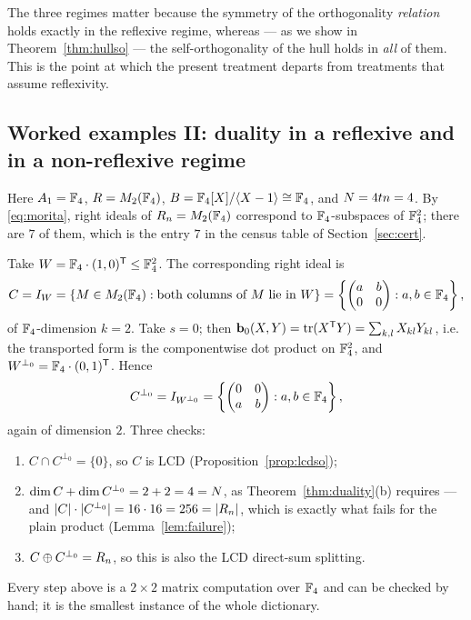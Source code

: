 \begin{remark}
The three regimes matter because the symmetry of the orthogonality
\emph{relation} holds exactly in the reflexive regime, whereas --- as we show in
Theorem~\ref{thm:hullso} --- the self-orthogonality of the hull holds in
\emph{all} of them. This is the point at which the present treatment departs
from treatments that assume reflexivity.
\end{remark}

\subsection{Worked examples II: duality in a reflexive and in a
non-reflexive regime}

\begin{example}[a Galois dual computed both ways, at $(q,t,n)=(4,1,1)$]
\label{ex:dual}
Here $A_1=\mathbb F_4$, $R=M_2(\mathbb F_4)$, $B=\mathbb F_4[X]/\langle X-1\rangle\cong\mathbb F_4$, and
$N=4tn=4$. By \eqref{eq:morita}, right ideals of $R_n=M_2(\mathbb F_4)$
correspond to $\mathbb F_4$-subspaces of $\mathbb F_4^2$; there are $7$ of them, which is
the entry $7$ in the census table of Section~\ref{sec:cert}.

Take $W=\mathbb F_4\cdot(1,0)^{\mathsf T}\le\mathbb F_4^2$. The corresponding right ideal is
\[
  C=I_W=\{M\in M_2(\mathbb F_4):\text{both columns of }M\text{ lie in }W\}
  =\left\{\begin{pmatrix}a&b\\0&0\end{pmatrix}:a,b\in\mathbb F_4\right\},
\]
of $\mathbb F_4$-dimension $k=2$. Take $s=0$; then $\mathbf b_0(X,Y)=\operatorname{tr}(X^{\mathsf T}Y)
=\sum_{k,l}X_{kl}Y_{kl}$, i.e. the transported form is the componentwise dot
product on $\mathbb F_4^2$, and $W^{\perp_0}=\mathbb F_4\cdot(0,1)^{\mathsf T}$. Hence
\[
  C^{\perp_0}=I_{W^{\perp_0}}
  =\left\{\begin{pmatrix}0&0\\a&b\end{pmatrix}:a,b\in\mathbb F_4\right\},
\]
again of dimension $2$. Three checks:
\begin{enumerate}[label=\textnormal{(\roman*)},leftmargin=*]
\item $C\cap C^{\perp_0}=\{0\}$, so $C$ is LCD (Proposition~\ref{prop:lcdso});
\item $\dim C+\dim C^{\perp_0}=2+2=4=N$, as
  Theorem~\ref{thm:duality}(b) requires --- and $|C|\cdot|C^{\perp_0}|
  =16\cdot16=256=|R_n|$, which is exactly what fails for the plain product
  (Lemma~\ref{lem:failure});
\item $C\oplus C^{\perp_0}=R_n$, so this is also the LCD direct-sum
  splitting.
\end{enumerate}
Every step above is a $2\times2$ matrix computation over $\mathbb F_4$ and can be
checked by hand; it is the smallest instance of the whole dictionary.
\end{example}

